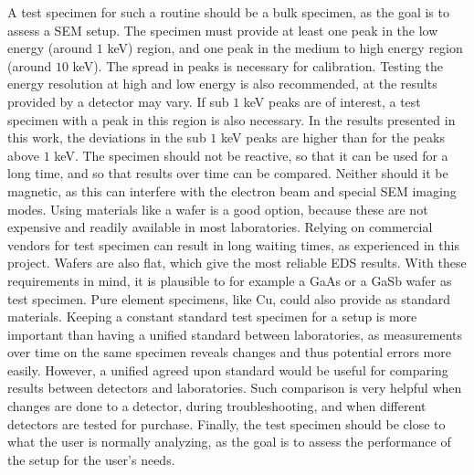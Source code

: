 A test specimen for such a routine should be a bulk specimen, as the goal is to assess a SEM setup.
The specimen must provide at least one peak in the low energy (around $1$ keV) region, and one peak in the medium to high energy region (around $10$ keV).
The spread in peaks is necessary for calibration.
Testing the energy resolution at high and low energy is also recommended, at the results provided by a detector may vary.
If sub $1$ keV peaks are of interest, a test specimen with a peak in this region is also necessary.
In the results presented in this work, the deviations in the sub $1$ keV peaks are higher than for the peaks above $1$ keV.
The specimen should not be reactive, so that it can be used for a long time, and so that results over time can be compared. 
Neither should it be magnetic, as this can interfere with the electron beam and special SEM imaging modes.
Using materials like a wafer is a good option, because these are not expensive and readily available in most laboratories.
Relying on commercial vendors for test specimen can result in long waiting times, as experienced in this project.
Wafers are also flat, which give the most reliable EDS results.
With these requirements in mind, it is plausible to for example a GaAs or a GaSb wafer as test specimen.
Pure element specimens, like Cu, could also provide as standard materials.
Keeping a constant standard test specimen for a setup is more important than having a unified standard between laboratories, as measurements over time on the same specimen reveals changes and thus potential errors more easily.
However, a unified agreed upon standard would be useful for comparing results between detectors and laboratories.
Such comparison is very helpful when changes are done to a detector, during troubleshooting, and when different detectors are tested for purchase.
Finally, the test specimen should be close to what the user is normally analyzing, as the goal is to assess the performance of the setup for the user's needs.





